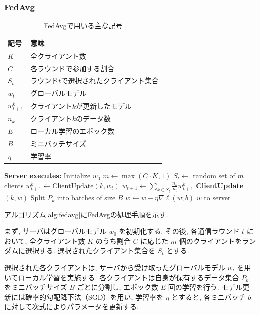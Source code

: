 \documentclass[a4j, twocolumn, dvipdfmx]{jsarticle}
\begin{document}
\subsubsection{FedAvg}
\begin{table}[t]
\centering
\caption{FedAvgで用いる主な記号}
\begin{tabular}{ll}
\hline
記号 & 意味 \\
\hline
$K$ & 全クライアント数 \\
$C$ & 各ラウンドで参加する割合 \\
$S_t$ & ラウンド$t$で選択されたクライアント集合 \\
$w_t$ & グローバルモデル \\
$w_{t+1}^k$ & クライアント$k$が更新したモデル \\
$n_k$ & クライアント$k$のデータ数 \\
$E$ & ローカル学習のエポック数 \\
$B$ & ミニバッチサイズ \\
$\eta$ & 学習率 \\
\hline
\end{tabular}
\label{tab:fedavg_symbol}
\end{table}
\begin{algorithm}[t]
\caption{Federated Averaging (FedAvg)}
\label{alg:fedavg}
\begin{algorithmic}[1]
\State \textbf{Server executes:}
\State Initialize $w_0$
    \State $m \leftarrow \max(C \cdot K, 1)$
    \State $S_t \leftarrow$ random set of $m$ clients
        \State $w_{t+1}^{k} \leftarrow \mathrm{ClientUpdate}(k,w_t)$
    \EndFor
    \State $
    w_{t+1}
    \leftarrow
    \sum_{k \in S_t}
    \frac{n_k}{n_t}
    w_{t+1}^{k}
    $
\EndFor
\Statex
\State \textbf{ClientUpdate}$(k,w)$
\State Split $P_k$ into batches of size $B$
        \State $
        w \leftarrow
        w-\eta\nabla\ell(w;b)
        $
    \EndFor
\EndFor
\State \Return $w$ to server
\end{algorithmic}
\end{algorithm}
アルゴリズム\ref{alg:fedavg}にFedAvgの処理手順を示す.

まず, サーバはグローバルモデル $w_0$ を初期化する.
その後, 各通信ラウンド $t$ において, 全クライアント数 $K$ のうち割合 $C$ に応じた $m$ 個のクライアントをランダムに選択する.
選択されたクライアント集合を $S_t$ とする.

選択された各クライアントは, サーバから受け取ったグローバルモデル $w_t$ を用いてローカル学習を実施する.
各クライアントは自身が保有するデータ集合 $P_k$ をミニバッチサイズ $B$ ごとに分割し, エポック数 $E$ 回の学習を行う.
モデル更新には確率的勾配降下法（SGD）を用い, 学習率を $\eta$ とすると, 各ミニバッチ $b$ に対して次式によりパラメータを更新する.
\end{document}
